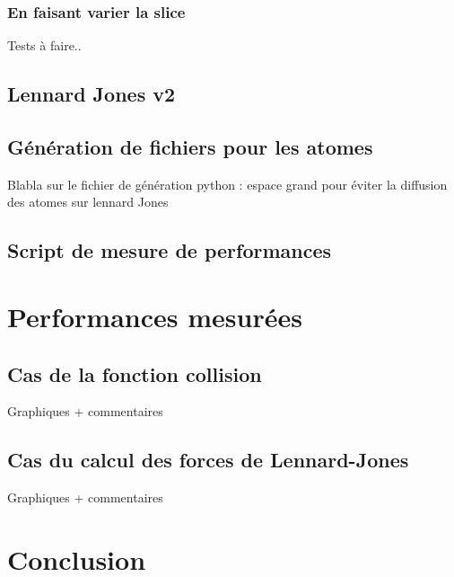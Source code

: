 \documentclass{article}
\begin{document}
\subsubsection{En faisant varier la slice}
Tests à faire..

\subsection{Lennard Jones v2}

\subsection{Génération de fichiers pour les atomes}
Blabla sur le fichier de génération python : espace grand pour éviter la
diffusion des atomes sur lennard Jones

\subsection{Script de mesure de performances}

\section{Performances mesurées}

\subsection{Cas de la fonction collision}
Graphiques + commentaires
\subsection{Cas du calcul des forces de Lennard-Jones}
Graphiques + commentaires

\section{Conclusion}
\end{document}
